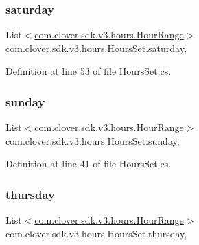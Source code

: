 \subsubsection{\texorpdfstring{saturday}{saturday}}
{\footnotesize\ttfamily List$<$\hyperlink{classcom_1_1clover_1_1sdk_1_1v3_1_1hours_1_1_hour_range}{com.\+clover.\+sdk.\+v3.\+hours.\+Hour\+Range}$>$ com.\+clover.\+sdk.\+v3.\+hours.\+Hours\+Set.\+saturday\hspace{0.3cm}{\ttfamily [get]}, {\ttfamily [set]}}



Definition at line 53 of file Hours\+Set.\+cs.

\mbox{\label{classcom_1_1clover_1_1sdk_1_1v3_1_1hours_1_1_hours_set_a591c5cd08ac6bc3fcd6b5e8d45d233d8}} 
\subsubsection{\texorpdfstring{sunday}{sunday}}
{\footnotesize\ttfamily List$<$\hyperlink{classcom_1_1clover_1_1sdk_1_1v3_1_1hours_1_1_hour_range}{com.\+clover.\+sdk.\+v3.\+hours.\+Hour\+Range}$>$ com.\+clover.\+sdk.\+v3.\+hours.\+Hours\+Set.\+sunday\hspace{0.3cm}{\ttfamily [get]}, {\ttfamily [set]}}



Definition at line 41 of file Hours\+Set.\+cs.

\mbox{\label{classcom_1_1clover_1_1sdk_1_1v3_1_1hours_1_1_hours_set_a3683df784015b6ab96128fe5e7fe17d9}} 
\subsubsection{\texorpdfstring{thursday}{thursday}}
{\footnotesize\ttfamily List$<$\hyperlink{classcom_1_1clover_1_1sdk_1_1v3_1_1hours_1_1_hour_range}{com.\+clover.\+sdk.\+v3.\+hours.\+Hour\+Range}$>$ com.\+clover.\+sdk.\+v3.\+hours.\+Hours\+Set.\+thursday\hspace{0.3cm}{\ttfamily [get]}, {\ttfamily [set]}}



